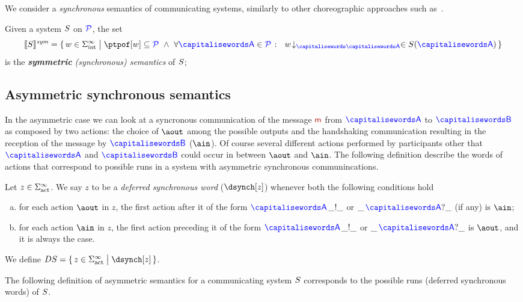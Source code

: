 We consider a \emph{synchronous} semantics of
communicating systems, similarly to other choreographic approaches
such as~\cite{BravettiZ07,CarboneHY12,Dezani-Ciancaglini16,SeveriD19}.

\begin{definition}\label{def:syncSem}
  Given a system $S$ on $\mathcal{\color{blue}{P}}$, the set
  \[
	 \ssem{\aCS} = \Set{\acword \in \alfint^\infty \sst  \ptpof[\acword] \subseteq \ptpset \ \land\ \forall \p \in
		\ptpset \qst \ \proj{\acword}{\p} \in \aCS(\p)}
  \]
  is the \emph{{\bf symmetric} (synchronous) semantics} of $S$;
\end{definition}

\subsection{Asymmetric synchronous semantics}

In the asymmetric case we can look at a syncronous communication of the message $\msg$
from $\p$ to $\q$ as composed by two actions: the choice of $\aout$ among the possible outputs and the
handshaking communication resulting in the reception of the message by $\q$ ($\ain$).
Of course several different actions performed by participants other that $\p$ and $\q$
could occur in between $\aout$ and $\ain$. The following definition describe the words
of actions that correspond to possible runs in a system with asymmetric synchronous communincations.
 

\begin{definition}
Let $z\in\Sigma_{\text{act}}^{\infty}$. We say $z$ to be a {\em deferred synchronous word} ($\dsynch[z]$) whenever both the following conditions hold
\begin{enumerate}[a)]
\item 
for each action $\aout$ in $z$, the first action after it of the form $\p\,\_!\_$ or  $\_\,\p?\_$ (if any) is $\ain$;
\item
for each action $\ain$ in $z$, the first action preceding it of the form $\p\,\_!\_$ or  $\_\,\p?\_$ is $\aout$, and it is always the case.
\end{enumerate}
We define $DS=\Set{z\in\alfact^\infty \sst \dsynch[z]}$.
\end{definition}

The following definition of asymmetric semantics for a communicating system $S$ corresponds
to the possible runs (deferred synchronous words) of  $S$.


